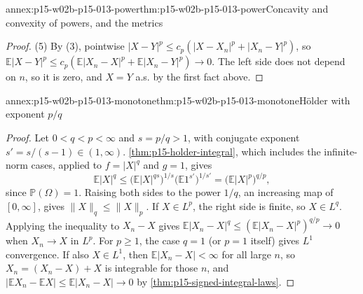 \begin{annexitem}{annex:p15-w02b-p15-013-power}{thm:p15-w02b-p15-013-power}{Concavity and convexity of powers, and the metrics}
\begin{proof}
(5) By (3), pointwise
\(|X-Y|^p\leq c_p(|X-X_n|^p+|X_n-Y|^p)\), so
\(\mathbb E|X-Y|^p\leq c_p(\mathbb E|X_n-X|^p+\mathbb E|X_n-Y|^p)\to0\).
The left side does not depend on \(n\), so it is zero, and \(X=Y\) a.s.
by the first fact above.
\end{proof}
\end{annexitem}

\begin{annexitem}{annex:p15-w02b-p15-013-monotone}{thm:p15-w02b-p15-013-monotone}{H\"older with exponent \(p/q\)}
\begin{proof}
Let \(0<q<p<\infty\) and \(s=p/q>1\), with conjugate exponent
\(s'=s/(s-1)\in(1,\infty)\). \cref{thm:p15-holder-integral}, which
includes the infinite-norm cases, applied to \(f=|X|^q\) and \(g=1\),
gives
\[
 \mathbb E|X|^q\leq\bigl(\mathbb E|X|^{qs}\bigr)^{1/s}
                  \bigl(\mathbb E1^{s'}\bigr)^{1/s'}
 =\bigl(\mathbb E|X|^p\bigr)^{q/p},
\]
since \(\mathbb P(\Omega)=1\). Raising both sides to the power
\(1/q\), an increasing map of \([0,\infty]\), gives
\(\|X\|_q\leq\|X\|_p\). If \(X\in L^p\), the right side is finite,
so \(X\in L^q\). Applying the inequality to \(X_n-X\) gives
\(\mathbb E|X_n-X|^q\leq(\mathbb E|X_n-X|^p)^{q/p}\to0\) when
\(X_n\to X\) in \(L^p\). For \(p\geq1\), the case \(q=1\) (or \(p=1\)
itself) gives \(L^1\) convergence. If also \(X\in L^1\), then
\(\mathbb E|X_n-X|<\infty\) for all large \(n\), so \(X_n=(X_n-X)+X\)
is integrable for those \(n\), and
\(|\mathbb EX_n-\mathbb EX|\leq\mathbb E|X_n-X|\to0\) by
\cref{thm:p15-signed-integral-laws}.
\end{proof}
\end{annexitem}


